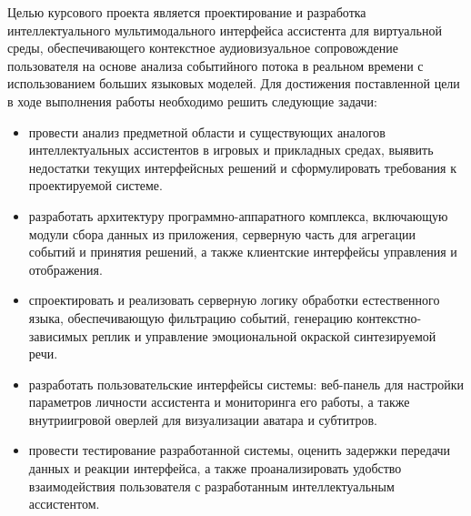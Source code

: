 Целью курсового проекта является проектирование и разработка интеллектуального мультимодального интерфейса ассистента для виртуальной среды, обеспечивающего контекстное аудиовизуальное сопровождение пользователя на основе анализа событийного потока в реальном времени с использованием больших языковых моделей.
Для достижения поставленной цели в ходе выполнения работы необходимо решить следующие задачи:
\begin{itemize}

\item провести анализ предметной области и существующих аналогов интеллектуальных ассистентов в игровых и прикладных средах, выявить недостатки текущих интерфейсных решений и сформулировать требования к проектируемой системе.
\item разработать архитектуру программно-аппаратного комплекса, включающую модули сбора данных из приложения, серверную часть для агрегации событий и принятия решений, а также клиентские интерфейсы управления и отображения.
\item спроектировать и реализовать серверную логику обработки естественного языка, обеспечивающую фильтрацию событий, генерацию контекстно-зависимых реплик и управление эмоциональной окраской синтезируемой речи.
\item разработать пользовательские интерфейсы системы: веб-панель для настройки параметров личности ассистента и мониторинга его работы, а также внутриигровой оверлей для визуализации аватара и субтитров.
\item провести тестирование разработанной системы, оценить задержки передачи данных и реакции интерфейса, а также проанализировать удобство взаимодействия пользователя с разработанным интеллектуальным ассистентом.

\end{itemize}